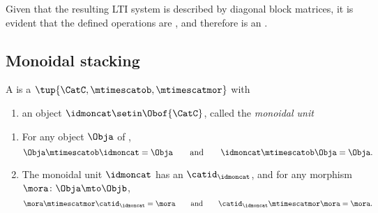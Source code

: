 Given that the resulting LTI system is described by diagonal block matrices, it is evident that the defined operations are , and therefore \LTI is an  .

\subsection{Monoidal stacking}

\begin{ctdefinition}
    \label{def:strict-monoidal-stacking-semicat}
    A  is a  $\tup{\CatC, \mtimescatob, \mtimescatmor}$ with

    \constit

    \begin{enumerate}
        \item an object $\idmoncat \setin \Obof{\CatC}$, called the \emph{monoidal unit}
    \end{enumerate}

    \condit

    \begin{enumerate}
        \item For any object $\Obja$ of \CatC,
              \begin{equation}
                  \Obja \mtimescatob \idmoncat = \Obja \qquad \text{and} \qquad \idmoncat \mtimescatob \Obja = \Obja.
              \end{equation}
        \item The monoidal unit $\idmoncat$ has an  $\catid_\idmoncat$, and for any morphism $\mora \colon \Obja \mto \Objb$,
              \begin{equation}
                  \mora \mtimescatmor \catid_\idmoncat = \mora \qquad \text{and} \qquad \catid_\idmoncat \mtimescatmor  \mora = \mora.
              \end{equation}
    \end{enumerate}
\end{ctdefinition}


